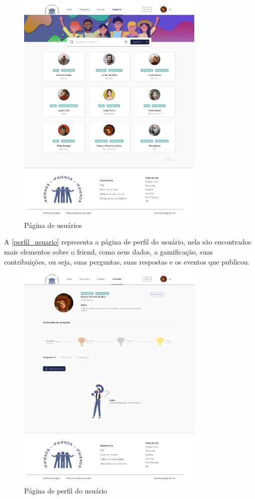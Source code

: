\begin{figure}[htb]
\centering
\caption{\label{cl_usuarios} Página de usuários}
\includegraphics[width=0.8\textwidth]{anexos/Imagens_Prototipo/com_login/usuarios.png}
\end{figure}
\FloatBarrier

A \autoref{perfil_usuario} representa a página de perfil do usuário, nela são encontrados mais elementos sobre o \gls{friend}, como seus dados, a \gls{gamificação}, suas contribuições, ou seja, suas perguntas, suas respostas e os eventos que publicou. 

\begin{figure}[htb]
\centering
\caption{\label{perfil_usuario} Página de perfil do usuário}
\includegraphics[width=0.8\textwidth]{anexos/Imagens_Prototipo/com_login/perfil_usuario.png}
\end{figure}
\FloatBarrier

